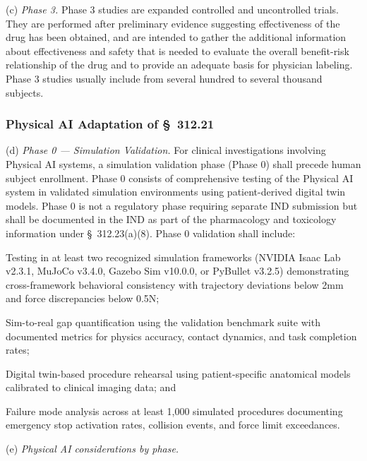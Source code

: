 \documentclass[11pt]{article}
\begin{document}
(c) \textit{Phase 3.} Phase 3 studies are expanded controlled and uncontrolled trials. They are performed after preliminary evidence suggesting effectiveness of the drug has been obtained, and are intended to gather the additional information about effectiveness and safety that is needed to evaluate the overall benefit-risk relationship of the drug and to provide an adequate basis for physician labeling. Phase 3 studies usually include from several hundred to several thousand subjects.

\subsubsection{Physical AI Adaptation of \S~312.21}

(d) \textit{Phase 0 --- Simulation Validation.} For clinical investigations involving Physical AI systems, a simulation validation phase (Phase 0) shall precede human subject enrollment. Phase 0 consists of comprehensive testing of the Physical AI system in validated simulation environments using patient-derived digital twin models. Phase 0 is not a regulatory phase requiring separate IND submission but shall be documented in the IND as part of the pharmacology and toxicology information under \S~312.23(a)(8). Phase 0 validation shall include:

\begin{description}[leftmargin=0.8cm,style=sameline]
\item[(i)] Testing in at least two recognized simulation frameworks (NVIDIA Isaac Lab v2.3.1, MuJoCo v3.4.0, Gazebo Sim v10.0.0, or PyBullet v3.2.5) demonstrating cross-framework behavioral consistency with trajectory deviations below 2mm and force discrepancies below 0.5N;
\item[(ii)] Sim-to-real gap quantification using the validation benchmark suite with documented metrics for physics accuracy, contact dynamics, and task completion rates;
\item[(iii)] Digital twin-based procedure rehearsal using patient-specific anatomical models calibrated to clinical imaging data; and
\item[(iv)] Failure mode analysis across at least 1,000 simulated procedures documenting emergency stop activation rates, collision events, and force limit exceedances.
\end{description}

(e) \textit{Physical AI considerations by phase.}
\end{document}
